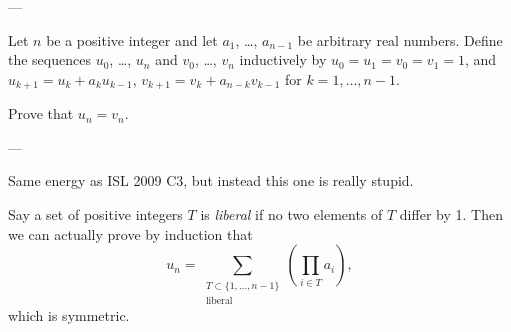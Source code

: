 
---

Let $n$ be a positive integer and let $a_1$, \ldots, $a_{n-1}$ be arbitrary real numbers. Define the sequences $u_0$, \ldots, $u_n$ and $v_0$, \ldots, $v_n$ inductively by $u_0=u_1 =v_0=v_1=1$, and $u_{k+1}=u_k+a_ku_{k-1}$, $v_{k+1}=v_k+a_{n-k}v_{k-1}$ for $k=1,\ldots,n-1$.

Prove that $u_n=v_n$.

---

Same energy as ISL 2009 C3, but instead this one is really stupid.

Say a set of positive integers $T$ is \emph{liberal} if no two elements of $T$ differ by 1. Then we can actually prove by induction that
\[u_n=\sum_{\substack{T\subset\{1,\ldots,n-1\}\\\text{liberal}}}\left(\prod_{i\in T}a_i\right),\]
which is symmetric.

